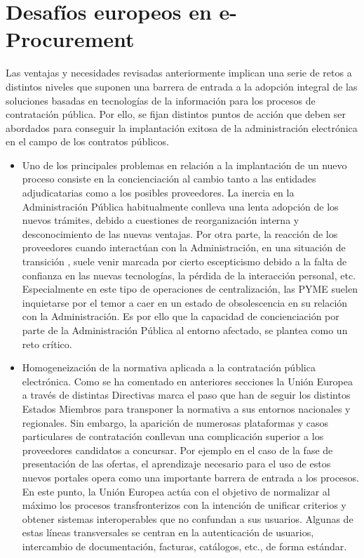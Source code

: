 \section{Desafíos europeos en e-Procurement}
Las ventajas y necesidades revisadas anteriormente implican una serie de retos a distintos
niveles que suponen una barrera de entrada a la adopción integral de las soluciones basadas
en tecnologías de la información para los procesos de contratación pública. Por ello,
se fijan distintos puntos de acción que deben ser abordados para conseguir la implantación
exitosa de la administración electrónica en el campo de los contratos públicos.

\begin{itemize}
 \item Uno de los principales problemas en relación a la implantación de un nuevo proceso consiste en la 
concienciación al cambio tanto a las entidades adjudicatarias como a los posibles proveedores. La inercia
en la Administración Pública habitualmente conlleva una lenta adopción de los nuevos trámites, debido
a cuestiones de reorganización interna y desconocimiento de las nuevas ventajas. Por otra parte, 
la reacción de los proveedores cuando interactúan con la Administración, en una situación de transición ,
suele venir marcada por cierto escepticismo debido a la falta de confianza
en las nuevas tecnologías, la pérdida de la interacción personal, etc. Especialmente en este
tipo de operaciones de centralización, las \gls{PYME} suelen inquietarse por el temor a caer en un 
estado de obsolescencia en su relación con la Administración. Es por ello que la
capacidad de concienciación por parte de la Administración Pública al entorno afectado, se plantea
como un reto crítico.

\item Homogeneización de la normativa aplicada a la contratación pública electrónica. Como
se ha comentado en anteriores secciones la Unión \gls{Europea} a través de distintas Directivas
marca el paso que han de seguir los distintos \gls{Estados} Miembros para transponer la normativa
a sus entornos nacionales y regionales. Sin embargo, la aparición de numerosas plataformas
y casos particulares de contratación conllevan una complicación superior a los proveedores
candidatos a concursar. Por ejemplo en el caso de la fase de presentación de las ofertas, 
el aprendizaje necesario para el uso de estos nuevos portales opera como una importante
barrera de entrada a los procesos. En este punto, la Unión Europea actúa con el objetivo
de normalizar al máximo los procesos transfronterizos con la intención de unificar criterios
y obtener sistemas interoperables que no confundan a sus usuarios. Algunas de estas líneas
transversales se centran en la autenticación de usuarios, intercambio de documentación,
facturas, catálogos, etc., de forma estándar.


\end{itemize}

